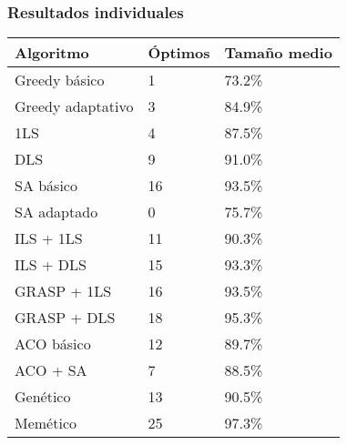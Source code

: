 \documentclass{beamer}
\theoremstyle{theorem}
\begin{document}
\begin{frame}
\frametitle{Resultados individuales}

  \tiny
  \begin{table}
  \begin{tabular}{l l l}
    \textbf{Algoritmo} & \textbf{Óptimos} & \textbf{Tamaño medio}  \\ \hline
    Greedy básico          & 1  & 73.2\% \\ \hline
    Greedy adaptativo      & 3  & 84.9\% \\ \hline
    1LS                    & 4  & 87.5\% \\ \hline
    DLS                    & 9  & 91.0\% \\ \hline
    SA básico              & 16  & 93.5\% \\ \hline
    SA adaptado            & 0  & 75.7\% \\ \hline
    ILS + 1LS              & 11  & 90.3\% \\ \hline
    ILS + DLS              & 15  & 93.3\%  \\ \hline
    GRASP + 1LS            & 16  & 93.5\% \\ \hline
    GRASP + DLS            & 18  & 95.3\% \\ \hline
    ACO básico             & 12  & 89.7\% \\ \hline
    ACO + SA               & 7  & 88.5\% \\ \hline
    Genético               & 13  & 90.5\% \\ \hline
    Memético               & 25  & 97.3\% \\ \hline
    \end{tabular}
  \end{table}
\end{frame}
\end{document}
